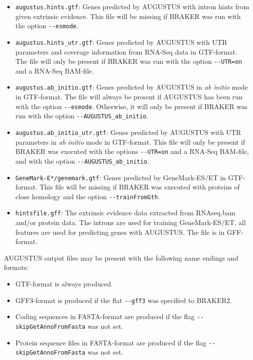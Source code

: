 \documentclass[]{article}
\begin{document}
\begin{itemize}
\item
  \texttt{augustus.hints.gtf}: Genes predicted by AUGUSTUS with intron hints from given extrinsic
  evidence. This file will be missing if BRAKER was run with the option
  \texttt{-\/-esmode}.
\item
  \texttt{augustus.hints_utr.gtf}: Genes predicted by AUGUSTUS with UTR parameters and coverage
  information from RNA-Seq data in GTF-format. The file will only be
  present if BRAKER was run with the option \texttt{-\/-UTR=on} and a
  RNA-Seq BAM-file.
\item
  \texttt{augustus.ab_initio.gtf}: Genes predicted by AUGUSTUS in \emph{ab initio} mode in GTF-format.
  The file will always be present if AUGUSTUS has been run with the
  option \texttt{-\/-esmode}. Otherwise, it will only be present if
  BRAKER was run with the option \texttt{-\/-AUGUSTUS\_ab\_initio}.
\item
  \texttt{augustus.ab_initio_utr.gtf}: Genes predicted by AUGUSTUS with UTR parameters in \emph{ab initio}
  mode in GTF-format. This file will only be present if BRAKER was
  executed with the options \texttt{-\/-UTR=on} and a RNA-Seq BAM-file,
  and with the option \texttt{-\/-AUGUSTUS\_ab\_initio}.
\item
  \texttt{GeneMark-E*/genemark.gtf}: Genes predicted by GeneMark-ES/ET in GTF-format. This file will be
  missing if BRAKER was executed with proteins of close homology and the
  option \texttt{-\/-trainFromGth}.
\item
  \texttt{hintsfile.gff}: The extrinsic evidence data extracted from RNAseq.bam and/or protein
  data. The introns are used for training GeneMark-ES/ET, all features
  are used for predicting genes with AUGUSTUS. The file is in
  GFF-format.
\end{itemize}

AUGUSTUS output files may be present with the following name endings and
formats:

\begin{itemize}
\item
  GTF-format is always produced.
\item
  GFF3-format is produced if the flat \texttt{-\/-gff3} was specified to
  BRAKER2.
\item
  Coding sequences in FASTA-format are produced if the flag
  \texttt{-\/-skipGetAnnoFromFasta} was not set.
\item
  Protein sequence files in FASTA-format are produced if the flag
  \texttt{-\/-skipGetAnnoFromFasta} was not set.
\end{itemize}
\end{document}
